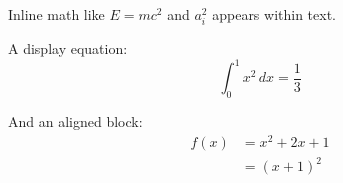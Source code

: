 Inline math like $E = mc^2$ and $a_i^2$ appears within text.

A display equation:
\[
  \int_0^1 x^2 \, dx = \frac{1}{3}
\]

And an aligned block:
\begin{align}
  f(x) &= x^2 + 2x + 1 \\
       &= (x + 1)^2
\end{align}
